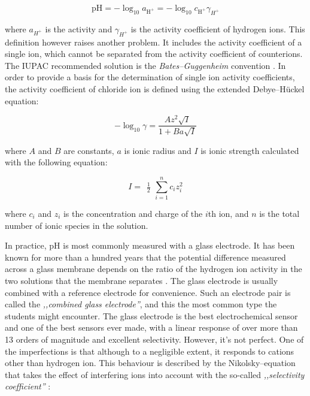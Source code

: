 \documentclass[manuscript=article, journal=jceda8]{achemso}
\begin{document}
\begin{equation}
\textrm{pH} = -\log_{10} a_{\textrm{H}^+} = -\log_{10} c_{\textrm{H}^+} \gamma_{H^+}
\end{equation}

where $a_{H^+}$ is the activity and $\gamma_{H^+}$ is the activity coefficient of hydrogen ions. This definition however raises another problem. It includes the activity coefficient of a single ion, which cannot be separated from the activity coefficient of counterions. The IUPAC recommended solution \cite{buck2002measurement} is the \emph{Bates--Guggenheim} convention  \cite{bates1960report}. In order to provide a basis for the determination of single ion activity coefficients, the activity coefficient of chloride ion is defined using the extended Debye--Hückel equation:

\begin{equation}
-\log_{10} \gamma = \frac{A z^2 \sqrt{I}} {1 + Ba\sqrt{I} }
\label{EDH}
\end{equation}

where $A$ and $B$ are constants, $a$ is ionic radius and $I$ is ionic strength calculated with the following equation:

\begin{equation}
I = \begin{matrix}\frac{1}{2}\end{matrix}\sum_{i=1}^{n} c_i z_i^{2}
\label{ionic_strength}
\end{equation}

where $c_i$ and $z_i$ is the concentration and charge of the $i$th ion, and $n$ is the total number of ionic species in the solution. 

In practice, pH is most commonly measured with a glass electrode.
It has been known for more than a hundred years that the potential difference measured across a glass membrane depends on the ratio of the hydrogen ion activity in the two solutions that the membrane separates \cite{haber1909elektrische, haber1909concerning}.
The glass electrode is usually combined with a reference electrode for convenience.
Such an electrode pair is called the \emph{,,combined glass electrode''}, and this the most common type the students might encounter.
The glass electrode is the best electrochemical sensor and one of the best sensors ever made, with a linear response of over more than 13 orders of magnitude and excellent selectivity.
However, it's not perfect. One of the imperfections is that although to a negligible extent, it responds to cations other than hydrogen ion.
This behaviour is described by the Nikolsky--equation that takes the effect of interfering ions into account with the so-called \emph{,,selectivity coefficient''} \cite{nicolsky1937theory}:
\end{document}
